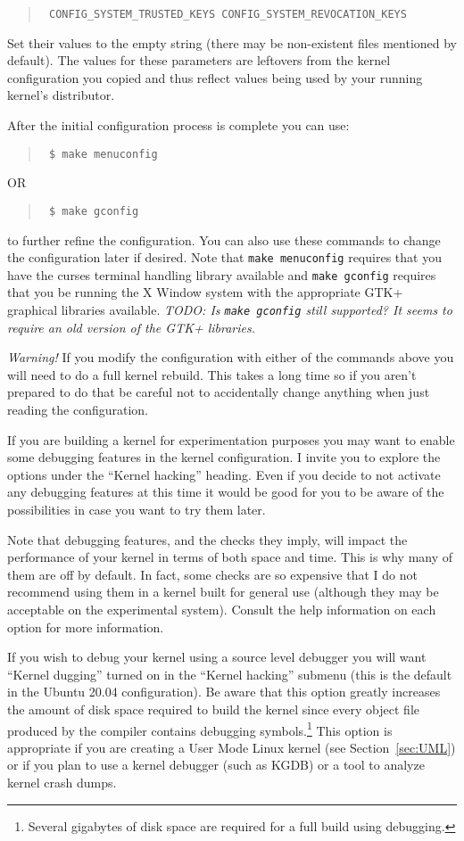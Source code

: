 \documentclass{article}
\newcommand{\command}[1]{\texttt{#1}}
\newcommand{\todo}[1]{\textit{TODO: #1}}
\newenvironment{commands}
  {\begin{quote} \tt}
  {\end{quote}}
\begin{document}
\begin{commands}
  CONFIG\_SYSTEM\_TRUSTED\_KEYS
  CONFIG\_SYSTEM\_REVOCATION\_KEYS
\end{commands}

Set their values to the empty string (there may be non-existent files mentioned by default). The
values for these parameters are leftovers from the kernel configuration you copied and thus
reflect values being used by your running kernel's distributor.

After the initial configuration process is complete you can use:
\begin{commands}
\$ make menuconfig
\end{commands}
OR
\begin{commands}
\$ make gconfig
\end{commands}

to further refine the configuration. You can also use these commands to change the configuration
later if desired. Note that \command{make menuconfig} requires that you have the curses terminal
handling library available and \command{make gconfig} requires that you be running the X Window
system with the appropriate GTK+ graphical libraries available. \todo{Is \texttt{make gconfig}
  still supported? It seems to require an old version of the GTK+ libraries.}

\textit{Warning!} If you modify the configuration with either of the commands above you will
need to do a full kernel rebuild. This takes a long time so if you aren't prepared to do that be
careful not to accidentally change anything when just reading the configuration.

If you are building a kernel for experimentation purposes you may want to enable some debugging
features in the kernel configuration. I invite you to explore the options under the ``Kernel
hacking'' heading. Even if you decide to not activate any debugging features at this time it
would be good for you to be aware of the possibilities in case you want to try them later.

Note that debugging features, and the checks they imply, will impact the performance of your
kernel in terms of both space and time. This is why many of them are off by default. In fact,
some checks are so expensive that I do not recommend using them in a kernel built for general
use (although they may be acceptable on the experimental system). Consult the help information
on each option for more information.

If you wish to debug your kernel using a source level debugger you will want ``Kernel dugging''
turned on in the ``Kernel hacking'' submenu (this is the default in the Ubuntu 20.04
configuration). Be aware that this option greatly increases the amount of disk space required to
build the kernel since every object file produced by the compiler contains debugging
symbols.\footnote{Several gigabytes of disk space are required for a full build using
  debugging.} This option is appropriate if you are creating a User Mode Linux kernel (see
Section~\ref{sec:UML}) or if you plan to use a kernel debugger (such as KGDB) or a tool to
analyze kernel crash dumps.
\end{document}
